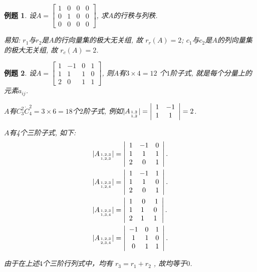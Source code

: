\documentclass[a4paper]{book}
\newtheorem{eg}{例题}[chapter]
\begin{document}
\begin{eg}
设$A=\begin{bmatrix}1&0&0&0\\0&1&0&0\\0&0&0&0\end{bmatrix}$, 求$A$的行秩与列秩.

易知: $r_1$与$r_2$是$A$的行向量集的极大无关组, 故 $r_r(A)=2$; $c_1$与$c_2$是$A$的列向量集的极大无关组, 故 $r_c(A)=2$.

\end{eg}

\begin{eg}
设$A=\begin{bmatrix}1&-1&0&1\\1&1&1&0\\2&0&1&1\end{bmatrix}$, 则$A$有$3\times 4=12$ 个$1$阶子式, 就是每个分量上的元素$a_{ij}$.

$A$有$C_3^2\dot C_4^2=3\times 6=18$个$2$阶子式, 例如$|A_{1,2\atop 1,2}|=\left|\begin{array}{cc}1&-1\\1&1\end{array}\right|=2$.

$A$有4个三阶子式, 如下:
\begin{displaymath}\begin{aligned}&
|A_{1,2,3\atop 1,2,3}|=\left|\begin{array}{ccc}1&-1&0\\1&1&1\\2&0&1\end{array}\right|.\\
&|A_{1,2,3\atop 1,2,4}|=\left|\begin{array}{ccc}1&-1&1\\1&1&0\\2&0&1\end{array}\right|.\\
&|A_{1,2,3\atop 1,3,4}|=\left|\begin{array}{ccc}1&\ 0&\ 1\\1&1&0\\2&1&1\end{array}\right|.\\
&|A_{1,2,3\atop 2,3,4}|=\left|\begin{array}{ccc}-1&0&1\\1&1&0\\0&1&1\end{array}\right|.\end{aligned}
\end{displaymath}

由于在上述$4$个三阶行列式中，均有 $r_3 = r_1+r_2$ , 故均等于$0$.

\end{eg}
\end{document}
